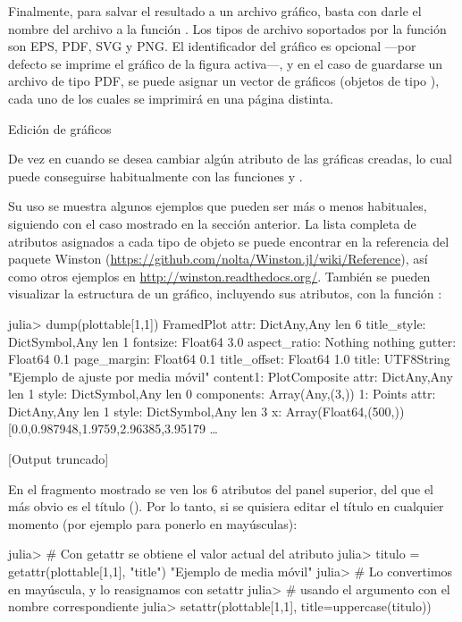﻿\documentclass[spanish]{article}
\begin{document}
Finalmente, para salvar el resultado a un archivo gráfico, basta con darle el nombre del archivo a la función . Los tipos de archivo soportados por la función son EPS, PDF, SVG y PNG. El identificador del gráfico es opcional ---por defecto se imprime el gráfico de la figura activa---, y en el caso de guardarse un archivo de tipo PDF, se puede asignar un vector de gráficos (objetos de tipo ), cada uno de los cuales se imprimirá en una página distinta.


Edición de gráficos

De vez en cuando se desea cambiar algún atributo de las gráficas creadas, lo cual puede conseguirse habitualmente con las funciones  y .

Su uso se muestra algunos ejemplos que pueden ser más o menos habituales, siguiendo con el caso mostrado en la sección anterior. La lista completa de atributos asignados a cada tipo de objeto se puede encontrar en la referencia del paquete Winston (\url{https://github.com/nolta/Winston.jl/wiki/Reference}), así como otros ejemplos en \url{http://winston.readthedocs.org/}. También se pueden visualizar la estructura de un gráfico, incluyendo sus atributos, con la función :
 
julia> dump(plottable[1,1])
FramedPlot 
  attr: Dict{Any,Any} len 6
    title_style: Dict{Symbol,Any} len 1
      fontsize: Float64 3.0
    aspect_ratio: Nothing nothing
    gutter: Float64 0.1
    page_margin: Float64 0.1
    title_offset: Float64 1.0
    title: UTF8String "Ejemplo de ajuste por media móvil"
  content1: PlotComposite 
    attr: Dict{Any,Any} len 1
      style: Dict{Symbol,Any} len 0
    components: Array(Any,(3,))
      1: Points 
        attr: Dict{Any,Any} len 1
          style: Dict{Symbol,Any} len 3
        x: Array(Float64,(500,)) [0.0,0.987948,1.9759,2.96385,3.95179 …  

[Output truncado]

En el fragmento mostrado se ven los 6 atributos del panel superior, del que el más obvio es el título (). Por lo tanto, si se quisiera editar el título en cualquier momento (por ejemplo para ponerlo en mayúsculas):

julia> # Con getattr se obtiene el valor actual del atributo
julia> titulo = getattr(plottable[1,1], "title")
"Ejemplo de media móvil"
julia> # Lo convertimos en mayúscula, y lo reasignamos con setattr
julia> # usando el argumento con el nombre correspondiente
julia> setattr(plottable[1,1], title=uppercase(titulo))
\end{document}

